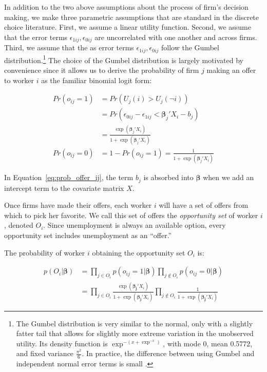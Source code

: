 In addition to the two above assumptions about the process of firm's decision
making, we make three parametric assumptions that are standard in the discrete
choice literature. First, we assume a linear utility function. Second, we assume
that the error terms $\epsilon_{1ij}, \epsilon_{0ij}$ are uncorrelated with one
another and across firms. Third, we assume that the as error terms
$\epsilon_{1ij}, \epsilon_{0ij}$ follow the Gumbel distribution.\footnote{The
  Gumbel distribution is very similar to the normal, only with a slightly fatter
  tail that allows for slightly more extreme variation in the unobserved
  utility. Its density function is $\exp^{-(x + \exp^{-x})}$, with mode 0, mean
  0.5772, and fixed variance $\frac{\pi^2}{6}$. In practice, the difference
  between using Gumbel and independent normal error terms is small
  \citep{Train2009}.} The choice of the Gumbel distribution is largely motivated
by convenience since it allows us to derive the probability of firm $j$ making
an offer to worker $i$ as the familiar binomial logit form:

\begin{align}
  Pr(o_{ij} = 1) &= Pr(U_j(i) > U_j(\neg i)) \\
                 &= Pr(\epsilon_{0ij} - \epsilon_{1ij} <  \bm{\beta}_j ' X_i - b_j) \\
                 &= \frac{\exp({\bm{\beta}_j'X_i})}{1 + \exp({\bm{\beta}_j'X_i})} \label{eq:prob_offer_ij} \\
  Pr(o_{ij} = 0) &= 1 - Pr(o_{ij} = 1) = \frac{1}{1 + \exp({\bm{\beta}_j'X_i})}
\end{align}

In Equation~\eqref{eq:prob_offer_ij}, the term $b_j$ is absorbed into
$\bm{\beta}$ when we add an intercept term to the covariate matrix $X$.

Once firms have made their offers, each worker $i$ will have a set of offers
from which to pick her favorite. We call this set of offers the
\textit{opportunity set} of worker $i$, denoted $O_i$. Since unemployment is
always an available option, every opportunity set includes unemployment as an
``offer.''

The probability of worker $i$ obtaining the opportunity set $O_i$ is:

\begin{align}
  p(O_i | \bm{\beta}) &= \prod_{j \in O_i} p(o_{ij} = 1 | \bm{\beta}) \prod_{j \notin O_i} p(o_{ij} = 0 | \bm{\beta}) \\
                      &= \prod_{j \in O_i} \frac{\exp(\bm{\beta_j} ' X_i)}{1 + \exp(\bm{\beta_j}' X_i)}
                        \prod_{j \notin O_i} \frac{1}{1 + \exp(\bm{\beta_j}' X_i)} \label{eq:conditional_probability_of_offer}
\end{align}


